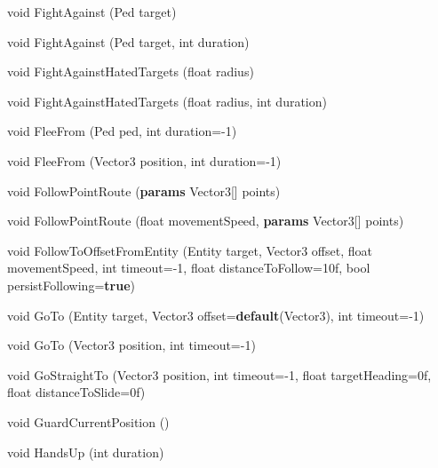 \documentclass[
  openany]{book}
\newenvironment{Shaded}{\begin{snugshade}}{\end{snugshade}}
\newcommand{\DataTypeTok}[1]{\textcolor[rgb]{0.13,0.29,0.53}{#1}}
\newcommand{\DecValTok}[1]{\textcolor[rgb]{0.00,0.00,0.81}{#1}}
\newcommand{\FunctionTok}[1]{\textcolor[rgb]{0.00,0.00,0.00}{#1}}
\newcommand{\KeywordTok}[1]{\textcolor[rgb]{0.13,0.29,0.53}{\textbf{#1}}}
\newcommand{\NormalTok}[1]{#1}
\begin{document}
\begin{Shaded}
\begin{Highlighting}[]
\DataTypeTok{void} \FunctionTok{FightAgainst}\NormalTok{ (Ped target)}
 
\DataTypeTok{void} \FunctionTok{FightAgainst}\NormalTok{ (Ped target, }\DataTypeTok{int}\NormalTok{ duration)}
 
\DataTypeTok{void} \FunctionTok{FightAgainstHatedTargets}\NormalTok{ (}\DataTypeTok{float}\NormalTok{ radius)}
 
\DataTypeTok{void} \FunctionTok{FightAgainstHatedTargets}\NormalTok{ (}\DataTypeTok{float}\NormalTok{ radius, }\DataTypeTok{int}\NormalTok{ duration)}
 
\DataTypeTok{void} \FunctionTok{FleeFrom}\NormalTok{ (Ped ped, }\DataTypeTok{int}\NormalTok{ duration=-}\DecValTok{1}\NormalTok{)}
 
\DataTypeTok{void} \FunctionTok{FleeFrom}\NormalTok{ (Vector3 position, }\DataTypeTok{int}\NormalTok{ duration=-}\DecValTok{1}\NormalTok{)}
 
\DataTypeTok{void} \FunctionTok{FollowPointRoute}\NormalTok{ (}\KeywordTok{params}\NormalTok{ Vector3[] points)}
 
\DataTypeTok{void} \FunctionTok{FollowPointRoute}\NormalTok{ (}\DataTypeTok{float}\NormalTok{ movementSpeed, }\KeywordTok{params}\NormalTok{ Vector3[] points)}
 
\DataTypeTok{void} \FunctionTok{FollowToOffsetFromEntity}\NormalTok{ (Entity target, Vector3 offset, }\DataTypeTok{float}\NormalTok{ movementSpeed, }\DataTypeTok{int}\NormalTok{ timeout=-}\DecValTok{1}\NormalTok{, }\DataTypeTok{float}\NormalTok{ distanceToFollow=10f, }\DataTypeTok{bool}\NormalTok{ persistFollowing=}\KeywordTok{true}\NormalTok{)}
 
\DataTypeTok{void} \FunctionTok{GoTo}\NormalTok{ (Entity target, Vector3 offset=}\KeywordTok{default}\NormalTok{(Vector3), }\DataTypeTok{int}\NormalTok{ timeout=-}\DecValTok{1}\NormalTok{)}
 
\DataTypeTok{void} \FunctionTok{GoTo}\NormalTok{ (Vector3 position, }\DataTypeTok{int}\NormalTok{ timeout=-}\DecValTok{1}\NormalTok{)}
 
\DataTypeTok{void} \FunctionTok{GoStraightTo}\NormalTok{ (Vector3 position, }\DataTypeTok{int}\NormalTok{ timeout=-}\DecValTok{1}\NormalTok{, }\DataTypeTok{float}\NormalTok{ targetHeading=0f, }\DataTypeTok{float}\NormalTok{ distanceToSlide=0f)}
 
\DataTypeTok{void} \FunctionTok{GuardCurrentPosition}\NormalTok{ ()}
 
\DataTypeTok{void} \FunctionTok{HandsUp}\NormalTok{ (}\DataTypeTok{int}\NormalTok{ duration)}
 

\end{Highlighting}
\end{Shaded}
\end{document}
